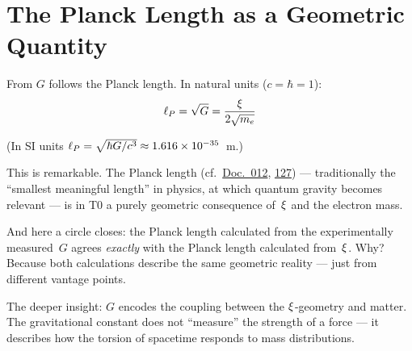 \section{The Planck Length as a Geometric Quantity}

From $G$ follows the Planck length. In natural units ($c = \hbar = 1$):
\begin{equation}
\ell_P = \sqrt{G} = \frac{\xi}{2\sqrt{m_e}}
\end{equation}

(In SI units $\ell_P = \sqrt{\hbar G/c^3} \approx 1.616 \times 10^{-35}$~m.)

This is remarkable. The Planck length (cf.\ \href{https://github.com/jpascher/T0-Time-Mass-Duality/blob/main/2/pdf/012_T0_Gravitationskonstante_De.pdf}{Doc.~012}, \href{https://github.com/jpascher/T0-Time-Mass-Duality/blob/main/2/pdf/127_gravitationskonstnte_De.pdf}{127}) --- traditionally the ``smallest meaningful length'' in physics, at which quantum gravity becomes relevant --- is in T0 a purely geometric consequence of~$\xi$ and the electron mass.

And here a circle closes: the Planck length calculated from the experimentally measured~$G$ agrees \emph{exactly} with the Planck length calculated from~$\xi$. Why? Because both calculations describe the same geometric reality --- just from different vantage points.

\begin{kerngedanke}
The deeper insight: $G$ encodes the coupling between the $\xi$-geometry and matter. The gravitational constant does not ``measure'' the strength of a force --- it describes how the torsion of spacetime responds to mass distributions.
\end{kerngedanke}
